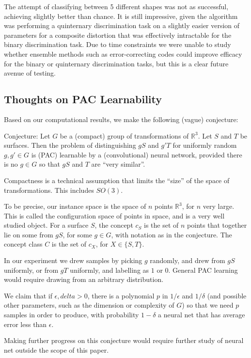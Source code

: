 \documentclass{article}
\begin{document}
The attempt of classifying between 5 different shapes was not as successful, achieving slightly better than chance.
It is still impressive, given the algorithm was performing a quinternary discrimination task on a slightly easier
version of parameters for a composite distortion that was effectively intractable for the binary discrimination task.
Due to time constraints we were unable to study whether ensemble methods such as
error-correcting codes \cite{dietterich1995solving}
could improve efficacy for the binary or quinternary discrimination tasks,
but this is a clear future avenue of testing.

\subsection{Thoughts on PAC Learnability}

Based on our computational results, we make the following (vague) conjecture:

Conjecture: Let $G$ be a (compact) group of transformations of $\mathbb{R}^3$.
Let $S$ and $T$ be surfaces. Then the problem of distinguishing $gS$ and $g'T$ for
uniformly random $g,g' \in G$ is (PAC) learnable by a (convolutional) neural network,
provided there is no $g \in G$ so that $gS$ and $T$ are ``very similar''.

Compactness is a technical assumption that limits the ``size'' of the space of transformations. This includes $SO(3)$.

To be precise, our instance space is the space of $n$ points $\mathbb{R}^3$, for $n$ very large. This is called the configuration space of points in space, and is a very well studied object.
For a surface $S$, the concept $c_S$ is the set of $n$ points that together
lie on some from $gS$, for some $g \in G$, with notation as in the conjecture.
The concept class $C$ is the set of $c_X$, for $X \in \{S,T\}$.

In our experiment we drew samples by
picking $g$ randomly, and drew from $gS$ uniformly, or from $gT$ uniformly,
and labelling as $1$ or $0$. General PAC learning would require drawing from an arbitrary distribution.

We claim that if $\epsilon, delta > 0$, there
is a polynomial $p$ in $1/\epsilon$ and $1 / \delta$ (and possible other parameters, such as the dimension or complexity of $G$) so that we need $p$ samples
in order to produce, with probability $1 - \delta$ a neural net that has average error
less than $\epsilon$.

Making further progress on this conjecture would require further study of neural net outside the scope of this paper.
\end{document}
